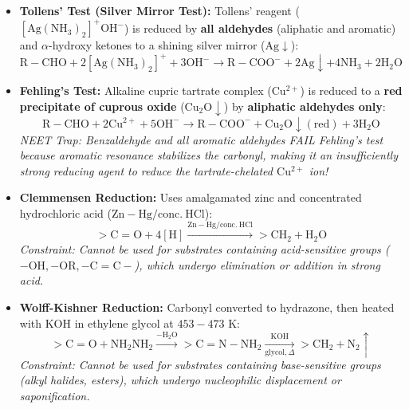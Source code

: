 \documentclass[10pt,a4paper]{article}
\begin{document}
\begin{usecasebox}
\begin{itemize}
  \item \textbf{Tollens' Test (Silver Mirror Test):}
  Tollens' reagent ($\mathrm{[Ag(NH_3)_2]^+OH^-}$) is reduced by \textbf{all aldehydes} (aliphatic and aromatic) and $\alpha$-hydroxy ketones to a shining silver mirror ($\mathrm{Ag}\downarrow$):
  \begin{equation}
    \mathrm{R-CHO} + 2\mathrm{[Ag(NH_3)_2]^+} + 3\mathrm{OH^-} \longrightarrow \mathrm{R-COO^-} + 2\mathbf{\mathrm{Ag}}\downarrow + 4\mathrm{NH_3} + 2\mathrm{H_2O}
  \end{equation}
  \item \textbf{Fehling's Test:} Alkaline cupric tartrate complex ($\mathrm{Cu^{2+}}$) is reduced to a \textbf{red precipitate of cuprous oxide} ($\mathrm{Cu_2O}\downarrow$) by \textbf{aliphatic aldehydes only}:
  \begin{equation}
    \mathrm{R-CHO} + 2\mathrm{Cu^{2+}} + 5\mathrm{OH^-} \longrightarrow \mathrm{R-COO^-} + \mathbf{\mathrm{Cu_2O}}\downarrow (\text{red}) + 3\mathrm{H_2O}
  \end{equation}
  \textit{NEET Trap: Benzaldehyde and all aromatic aldehydes FAIL Fehling's test because aromatic resonance stabilizes the carbonyl, making it an insufficiently strong reducing agent to reduce the tartrate-chelated $\mathrm{Cu^{2+}}$ ion!}
\end{itemize}
\end{usecasebox}

\begin{formulabox}
\begin{itemize}
  \item \textbf{Clemmensen Reduction:} Uses amalgamated zinc and concentrated hydrochloric acid ($\mathrm{Zn-Hg / conc.\ HCl}$):
  \begin{equation}
    >\mathrm{C=O} + 4[\mathrm{H}] \xrightarrow{\mathrm{Zn-Hg / conc.\ HCl}} >\mathbf{\mathrm{CH_2}} + \mathrm{H_2O}
  \end{equation}
  \textit{Constraint: Cannot be used for substrates containing acid-sensitive groups ($-\mathrm{OH}, -\mathrm{OR}, -\mathrm{C=C}-$), which undergo elimination or addition in strong acid.}
  \item \textbf{Wolff-Kishner Reduction:} Carbonyl converted to hydrazone, then heated with $\mathrm{KOH}$ in ethylene glycol at $453-473\text{ K}$:
  \begin{equation}
    >\mathrm{C=O} + \mathrm{NH_2NH_2} \xrightarrow{-\mathrm{H_2O}} >\mathrm{C=N-NH_2} \xrightarrow[\text{glycol}, \Delta]{\mathrm{KOH}} >\mathbf{\mathrm{CH_2}} + \mathrm{N_2}\uparrow
  \end{equation}
  \textit{Constraint: Cannot be used for substrates containing base-sensitive groups (alkyl halides, esters), which undergo nucleophilic displacement or saponification.}
\end{itemize}
\end{formulabox}
\end{document}
